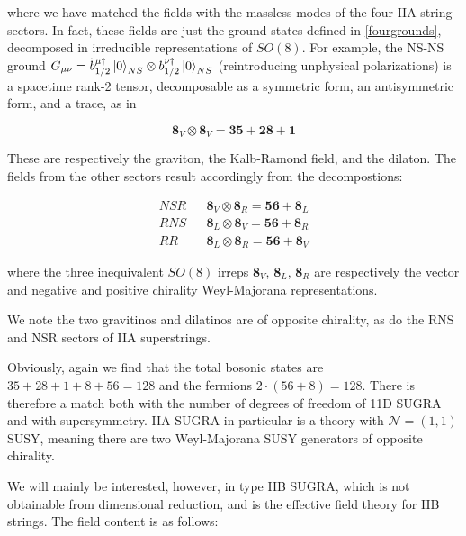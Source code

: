 where we have matched the fields with the massless modes of the four IIA string sectors. In fact, these fields are just the ground states defined in \eqref{fourgrounds}, decomposed in irreducible representations of $SO(8)$. For example, the NS-NS ground $G_{\mu\nu} = \tilde{b}_{1/2}^{\mu\dagger} \ket{0}_{NS} \otimes b_{1/2}^{\nu\dagger} \ket{0}_{NS}$ (reintroducing unphysical polarizations) is a spacetime rank-2 tensor, decomposable as a symmetric form, an antisymmetric form, and a trace, as in

\begin{equation}
	\mathbf{8}_V \otimes \mathbf{8}_V = \mathbf{35} +  \mathbf{28} + \mathbf{1} 	\label{}
\end{equation}

These are respectively the graviton, the Kalb-Ramond field, and the dilaton. The fields from the other sectors result accordingly from the decompostions:

\begin{align}
	NSR && \mathbf{8}_V \otimes \mathbf{8}_R = \mathbf{56} + \mathbf{8}_L\\
	RNS && \mathbf{8}_L \otimes \mathbf{8}_V = \mathbf{56} + \mathbf{8}_R\\
	RR  && \mathbf{8}_L \otimes \mathbf{8}_R = \mathbf{56} + \mathbf{8}_V
	\label{}
\end{align}

where the three inequivalent $SO(8)$ irreps $\mathbf{8}_V$, $\mathbf{8}_L$, $\mathbf{8}_R$ are respectively the vector and negative and positive chirality Weyl-Majorana representations.

We note the two gravitinos and dilatinos are of opposite chirality, as do the RNS and NSR sectors of IIA superstrings. 


Obviously, again we find that the total bosonic states are $35+28+1+8+56 = 128$ and the fermions $2\cdot (56+8) = 128$. There is therefore a match both with the number of degrees of freedom of 11D SUGRA and with supersymmetry. IIA SUGRA in particular is a theory with $\mathcal{N}=(1,1)$ SUSY, meaning there are two Weyl-Majorana SUSY generators of opposite chirality.


We will mainly be interested, however, in type IIB SUGRA, which is not obtainable from dimensional reduction, and is the effective field theory for IIB strings. The field content is as follows:


